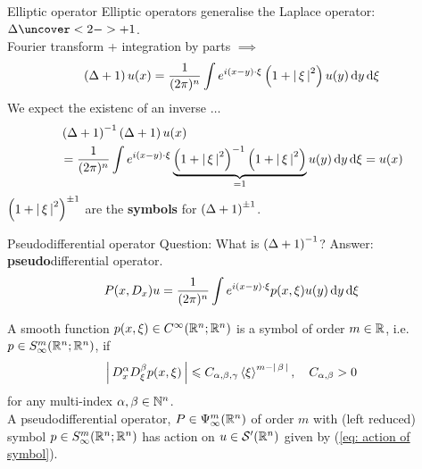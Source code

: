 \documentclass{beamer}
\begin{document}
\begin{frame}{Elliptic operator}
Elliptic operators generalise the Laplace operator: $\Delta \uncover<2->{+1}$. \\
Fourier transform + integration by parts $\implies$ 
\begin{align*}
\brac{\Delta + 1} u(x) = \frac{1}{(2\pi)^n} \int e^{i(x - y) \cdot \xi} \brac{1 + \abs{\xi}^2} u(y) \d[y]  \d[\xi]
\end{align*}
We expect the existenc of an inverse $\dots$ 
\begin{align*}
&\brac{\Delta + 1}^{-1} \brac{\Delta + 1} u(x) \\
&= \frac{1}{(2\pi)^n} \int e^{i(x - y) \cdot \xi} \underbrace{\brac{1 + \abs{\xi}^2}^{-1} \brac{1 + \abs{\xi}^2}}_{= 1} u(y) \d[y]  \d[\xi] = u(x) 
\end{align*}
$\brac{1 + \abs{\xi}^2}^{\pm 1} $ are the \textbf{symbols} for $\brac{\Delta + 1}^{\pm 1} $. 
\end{frame} 

\begin{frame}{Pseudodifferential operator}
Question: What is $\brac{\Delta + 1}^{-1}$? Answer: \textbf{pseudo}differential operator. 
\begin{align}
P(x, D_x) u = \frac{1}{(2\pi)^n} \int e^{i(x - y) \cdot \xi} p(x, \xi) u(y) \d[y] \d[\xi]  \label{eq: action of symbol} 
\end{align}
\begin{definition} A smooth function $p(x, \xi) \in C^\infty(\R^{n}; \R^n)$ is a symbol of order $m \in \R$, i.e. $p \in S^{m}_\infty(\R^{n}; \R^n)$, if
    \begin{align*}
    \abs{D^{\alpha}_x D^\beta_\xi p(x, \xi)} \leq C_{\alpha, \beta, \gamma}  \sym[\xi]^{m - \abs{\beta}}, \quad C_{\alpha, \beta}  > 0
    \end{align*}
    for any multi-index $\alpha, \beta \in \N^n$. \\
    
    A pseudodifferential operator, $P \in \Psi^{m}_{\infty}(\R^n)$ of order $m$ with (left reduced) symbol $p \in S^{m}_\infty(\R^{n}; \R^n)$ has action on $u \in \sch'(\R^n)$ given by (\ref{eq: action of symbol}). 
\end{definition}
\end{frame} 
\end{document}
